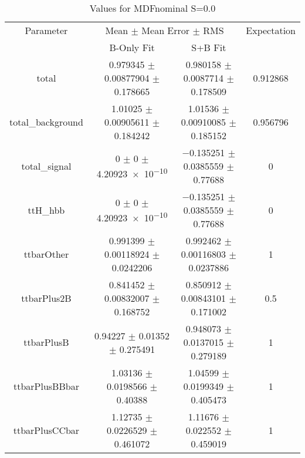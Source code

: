 \begin{table}
\centering
\caption{Values for MDFnominal S=0.0}
\begin{tabular}{cccc}
\toprule
Parameter & \multicolumn{2}{c}{Mean $\pm$ Mean Error $\pm$ RMS} & Expectation\\
 & B-Only Fit & S+B Fit & \\
\midrule
total & \num{0.979345} $\pm$ \num{0.00877904} $\pm$ \num{0.178665} & \num{0.980158} $\pm$ \num{0.0087714} $\pm$ \num{0.178509} & \num{0.912868}\\
total\_background & \num{1.01025} $\pm$ \num{0.00905611} $\pm$ \num{0.184242} & \num{1.01536} $\pm$ \num{0.00910085} $\pm$ \num{0.185152} & \num{0.956796}\\
total\_signal & \num{0} $\pm$ \num{0} $\pm$ \num{4.20923e-10} & \num{-0.135251} $\pm$ \num{0.0385559} $\pm$ \num{0.77688} & \num{0}\\
ttH\_hbb & \num{0} $\pm$ \num{0} $\pm$ \num{4.20923e-10} & \num{-0.135251} $\pm$ \num{0.0385559} $\pm$ \num{0.77688} & \num{0}\\
ttbarOther & \num{0.991399} $\pm$ \num{0.00118924} $\pm$ \num{0.0242206} & \num{0.992462} $\pm$ \num{0.00116803} $\pm$ \num{0.0237886} & \num{1}\\
ttbarPlus2B & \num{0.841452} $\pm$ \num{0.00832007} $\pm$ \num{0.168752} & \num{0.850912} $\pm$ \num{0.00843101} $\pm$ \num{0.171002} & \num{0.5}\\
ttbarPlusB & \num{0.94227} $\pm$ \num{0.01352} $\pm$ \num{0.275491} & \num{0.948073} $\pm$ \num{0.0137015} $\pm$ \num{0.279189} & \num{1}\\
ttbarPlusBBbar & \num{1.03136} $\pm$ \num{0.0198566} $\pm$ \num{0.40388} & \num{1.04599} $\pm$ \num{0.0199349} $\pm$ \num{0.405473} & \num{1}\\
ttbarPlusCCbar & \num{1.12735} $\pm$ \num{0.0226529} $\pm$ \num{0.461072} & \num{1.11676} $\pm$ \num{0.022552} $\pm$ \num{0.459019} & \num{1}\\
\bottomrule
\end{tabular}
\end{table}